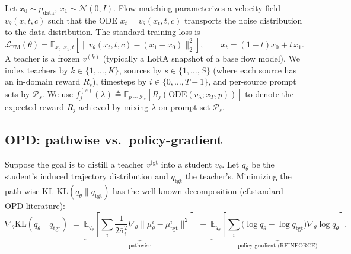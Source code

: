 \documentclass[11pt,a4paper]{article}
\newcommand{\loss}{\mathcal{L}}
\newcommand{\E}{\mathbb{E}}
\newcommand{\KL}{\mathrm{KL}}
\newcommand{\N}{\mathcal{N}}
\theoremstyle{definition}
\begin{document}
Let $x_0 \sim p_{\text{data}}$, $x_1 \sim \N(0,I)$. Flow
matching parameterizes a velocity field
$v_\theta(x,t,c)$ such that the ODE $\dot x_t = v_\theta(x_t,t,c)$
transports the noise distribution to the data distribution. The standard
training loss is
\begin{equation}
\loss_{\text{FM}}(\theta) = \E_{x_0,x_1,t}\!\left[
\big\| v_\theta(x_t,t,c) - (x_1 - x_0) \big\|_2^2
\right],\qquad x_t = (1-t) x_0 + t\,x_1.
\label{eq:fm}
\end{equation}
A teacher is a frozen $v^{(k)}$ (typically a LoRA snapshot of a base flow
model). We index teachers by $k\in\{1,\ldots,K\}$, sources by
$s\in\{1,\ldots,S\}$ (where each source has an in-domain reward $R_s$),
timesteps by $i\in\{0,\ldots,T-1\}$, and per-source prompt sets by
$\mathcal{P}_s$. We use $f_j^{(s)}(\lambda)\triangleq
\E_{p\sim\mathcal{P}_s}[R_j(\mathrm{ODE}(v_\lambda;x_T,p))]$ to denote the
expected reward $R_j$ achieved by mixing $\lambda$ on prompt set
$\mathcal{P}_s$.

\subsection{OPD: pathwise vs.\ policy-gradient}
\label{ssec:opd_decomp}

Suppose the goal is to distill a teacher $v^{\mathrm{tgt}}$ into a student
$v_\theta$. Let $q_\theta$ be the student's induced trajectory distribution
and $q_{\mathrm{tgt}}$ the teacher's. Minimizing the path-wise KL
$\KL(q_\theta\|q_{\mathrm{tgt}})$ has the well-known
decomposition (cf.\@ standard OPD literature):
\begin{equation}
\nabla_\theta \KL(q_\theta\|q_{\mathrm{tgt}})
\;=\;
\underbrace{\E_{q_\theta}\!\left[\sum_i\frac{1}{2\bar\sigma_i^2}\nabla_\theta\| \mu_\theta^i - \mu_{\mathrm{tgt}}^i \|^2\right]}_{\text{pathwise}}
\;+\;
\underbrace{\E_{q_\theta}\!\left[\sum_i \big(\log q_\theta - \log q_{\mathrm{tgt}}\big)\nabla_\theta\log q_\theta\right]}_{\text{policy-gradient (REINFORCE)}}.
\label{eq:kl_decomp}
\end{equation}
\end{document}
